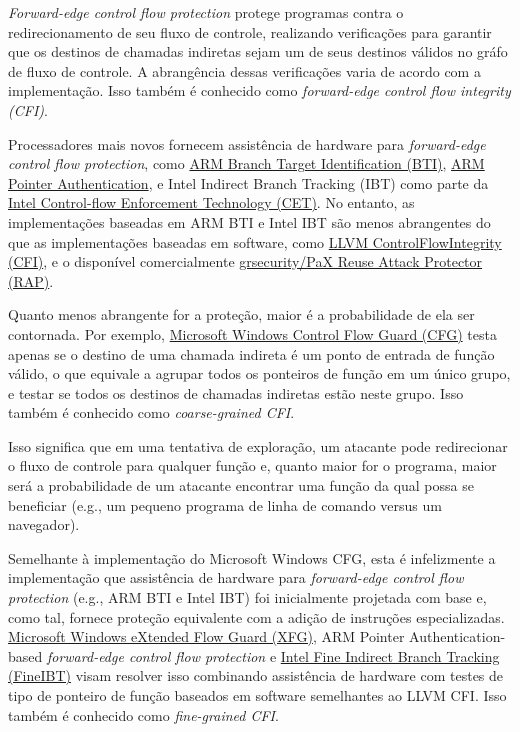 \documentclass{article}
\begin{document}
\textit{Forward-edge control flow protection} protege programas contra o redirecionamento de seu fluxo de controle, realizando verificações para garantir que os destinos de chamadas indiretas sejam um de seus destinos válidos no gráfo de fluxo de controle. A abrangência dessas verificações varia de acordo com a implementação. Isso também é conhecido como \textit{forward-edge control flow integrity (CFI)}.

Processadores mais novos fornecem assistência de hardware para \textit{forward-edge control flow protection}, como \href{https://community.arm.com/arm-community-blogs/b/tools-software-ides-blog/posts/code-reuse-attacks-the-compiler-story}{ARM Branch Target Identification (BTI)}, \href{https://community.arm.com/arm-community-blogs/b/architectures-and-processors-blog/posts/armv8-1-m-pointer-authentication-and-branch-target-identification-extension}{ARM Pointer Authentication}, e Intel Indirect Branch Tracking (IBT) como parte da \href{https://www.intel.com/content/www/us/en/developer/articles/technical/technical-look-control-flow-enforcement-technology.html}{Intel Control-flow Enforcement Technology (CET)}. No entanto, as implementações baseadas em ARM BTI e Intel IBT são menos abrangentes do que as implementações baseadas em software, como \href{https://clang.llvm.org/docs/ControlFlowIntegrity.html}{LLVM ControlFlowIntegrity (CFI)}, e o disponível comercialmente \href{https://grsecurity.net/rap_faq}{grsecurity/PaX Reuse Attack Protector (RAP)}.

Quanto menos abrangente for a proteção, maior é a probabilidade de ela ser contornada. Por exemplo, \href{https://learn.microsoft.com/en-us/windows/win32/secbp/control-flow-guard}{Microsoft Windows Control Flow Guard (CFG)} testa apenas se o destino de uma chamada indireta é um ponto de entrada de função válido, o que equivale a agrupar todos os ponteiros de função em um único grupo, e testar se todos os destinos de chamadas indiretas estão neste grupo. Isso também é conhecido como \textit{coarse-grained CFI}.

Isso significa que em uma tentativa de exploração, um atacante pode redirecionar o fluxo de controle para qualquer função e, quanto maior for o programa, maior será a probabilidade de um atacante encontrar uma função da qual possa se beneficiar (e.g., um pequeno programa de linha de comando versus um navegador).

Semelhante à implementação do Microsoft Windows CFG, esta é infelizmente a implementação que assistência de hardware para \textit{forward-edge control flow protection} (e.g., ARM BTI e Intel IBT) foi inicialmente projetada com base e, como tal, fornece proteção equivalente com a adição de instruções especializadas. \href{https://query.prod.cms.rt.microsoft.com/cms/api/am/binary/RE37dMC}{Microsoft Windows eXtended Flow Guard (XFG)}, ARM Pointer Authentication-based \textit{forward-edge control flow protection} e \href{https://arxiv.org/abs/2303.16353}{Intel Fine Indirect Branch Tracking (FineIBT)} visam resolver isso combinando assistência de hardware com testes de tipo de ponteiro de função baseados em software semelhantes ao LLVM CFI. Isso também é conhecido como \textit{fine-grained CFI}.
\end{document}

